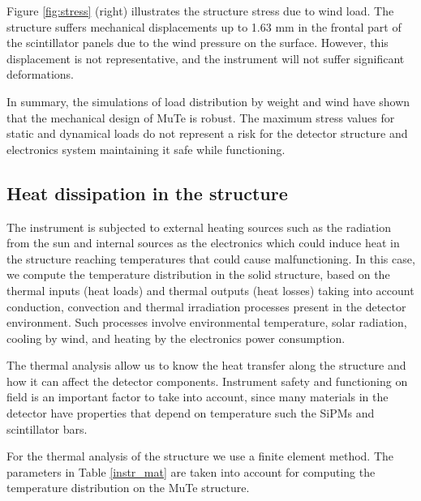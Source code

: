 \documentclass[letterpaper,11pt]{article}
\begin{document}

Figure \ref{fig:stress} (right) illustrates the structure stress due to wind load. The structure suffers mechanical displacements up to 1.63 mm in the frontal part of the scintillator panels due to the wind pressure on the surface. However, this displacement is not representative, and the instrument will not suffer significant deformations.

In summary, the simulations of load distribution by weight and wind have shown that the mechanical design of MuTe is robust. The maximum stress values for static and dynamical loads do not represent a risk for the detector structure and electronics system maintaining it safe while functioning.

\subsection{Heat dissipation in the structure}

The instrument is subjected to external heating sources such as the radiation from the sun and internal sources as the electronics which could induce heat in the structure reaching temperatures that could cause malfunctioning. In this case, we compute the temperature distribution in the solid structure, based on the thermal inputs (heat loads) and thermal outputs (heat losses) taking into account conduction, convection and thermal irradiation processes present in the detector environment. Such processes involve environmental temperature, solar radiation, cooling by wind, and heating by the electronics power consumption.

The thermal analysis allow us to know the heat transfer along the structure and how it can affect the detector components. Instrument safety and functioning on field is an important factor to take into account, since many materials in the detector have properties that depend on temperature such the SiPMs and scintillator bars.

For the thermal analysis of the structure we use a finite element method. The parameters in Table \ref{instr_mat} are taken into account for computing the temperature distribution on the MuTe structure. 
\end{document}
